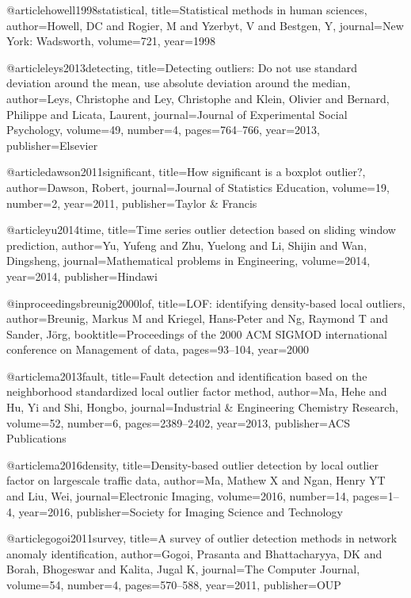 @article{howell1998statistical,
  title={Statistical methods in human sciences},
  author={Howell, DC and Rogier, M and Yzerbyt, V and Bestgen, Y},
  journal={New York: Wadsworth},
  volume={721},
  year={1998}
}

@article{leys2013detecting,
  title={Detecting outliers: Do not use standard deviation around the mean, use absolute deviation around the median},
  author={Leys, Christophe and Ley, Christophe and Klein, Olivier and Bernard, Philippe and Licata, Laurent},
  journal={Journal of Experimental Social Psychology},
  volume={49},
  number={4},
  pages={764--766},
  year={2013},
  publisher={Elsevier}
}

@article{dawson2011significant,
  title={How significant is a boxplot outlier?},
  author={Dawson, Robert},
  journal={Journal of Statistics Education},
  volume={19},
  number={2},
  year={2011},
  publisher={Taylor \& Francis}
}

@article{yu2014time,
  title={Time series outlier detection based on sliding window prediction},
  author={Yu, Yufeng and Zhu, Yuelong and Li, Shijin and Wan, Dingsheng},
  journal={Mathematical problems in Engineering},
  volume={2014},
  year={2014},
  publisher={Hindawi}
}

@inproceedings{breunig2000lof,
  title={LOF: identifying density-based local outliers},
  author={Breunig, Markus M and Kriegel, Hans-Peter and Ng, Raymond T and Sander, J{\"o}rg},
  booktitle={Proceedings of the 2000 ACM SIGMOD international conference on Management of data},
  pages={93--104},
  year={2000}
}

@article{ma2013fault,
  title={Fault detection and identification based on the neighborhood standardized local outlier factor method},
  author={Ma, Hehe and Hu, Yi and Shi, Hongbo},
  journal={Industrial \& Engineering Chemistry Research},
  volume={52},
  number={6},
  pages={2389--2402},
  year={2013},
  publisher={ACS Publications}
}

@article{ma2016density,
  title={Density-based outlier detection by local outlier factor on largescale traffic data},
  author={Ma, Mathew X and Ngan, Henry YT and Liu, Wei},
  journal={Electronic Imaging},
  volume={2016},
  number={14},
  pages={1--4},
  year={2016},
  publisher={Society for Imaging Science and Technology}
}

@article{gogoi2011survey,
  title={A survey of outlier detection methods in network anomaly identification},
  author={Gogoi, Prasanta and Bhattacharyya, DK and Borah, Bhogeswar and Kalita, Jugal K},
  journal={The Computer Journal},
  volume={54},
  number={4},
  pages={570--588},
  year={2011},
  publisher={OUP}
}

